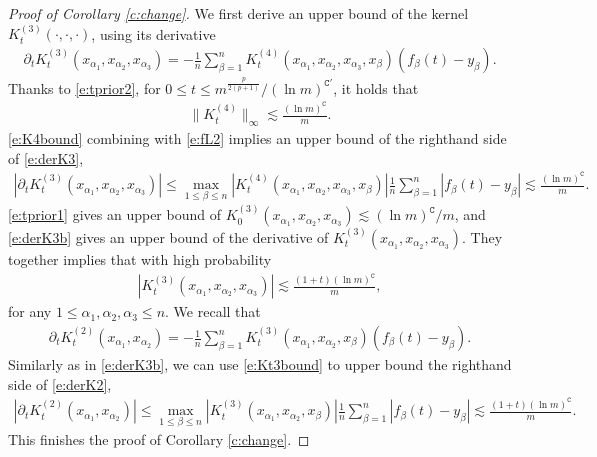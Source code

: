\documentclass{article}
\numberwithin{equation}{section}
\newcommand{\fC}{{\mathtt C}}
\newcommand{\al}{\alpha}
\renewcommand{\leq}{\leqslant}
\newcommand{\del}{\partial}
\newcommand{\1}{\mathds{1}}
\theoremstyle{plain} %
\begin{document}
\begin{proof}[Proof of Corollary \ref{c:change}]
We first derive an upper bound of the kernel $K_t^{(3)}(\cdot, \cdot, \cdot)$, using its derivative
\begin{align}\label{e:derK3}
\del_tK_t^{(3)}(x_{\al_1},x_{\al_2}, x_{\al_3})=-\frac{1}{n} \sum_{\beta=1}^n K^{(4)}_t(x_{\al_1}, x_{\al_2}, x_{\alpha_3}, x_\beta)(f_\beta(t)-y_\beta).
\end{align}
Thanks to \eqref{e:tprior2}, for $0\leq t\leq m^{\frac{p}{2(p+1)}}/(\ln m)^{\fC'}$, it holds that
\begin{align}\label{e:K4bound}
\|K^{(4)}_t\|_{\infty}\lesssim \frac{(\ln m)^\fC}{m}.
\end{align}
\eqref{e:K4bound} combining with \eqref{e:fL2} implies an upper bound of the righthand side of \eqref{e:derK3},
\begin{align}\label{e:derK3b}
\left|\del_tK_t^{(3)}(x_{\al_1},x_{\al_2}, x_{\al_3})\right|\leq \max_{1\leq \beta \leq n}|K^{(4)}_t(x_{\al_1}, x_{\al_2}, x_{\alpha_3}, x_\beta)|\frac{1}{n} \sum_{\beta=1}^n |f_\beta(t)-y_\beta|
\lesssim \frac{(\ln m)^{\fC}}{m}.
\end{align}
\eqref{e:tprior1} gives an upper bound of $K_0^{(3)}(x_{\al_1},x_{\al_2}, x_{\al_3})\lesssim (\ln m)^{\fC}/m$, and \eqref{e:derK3b} gives an upper bound of the derivative of $K_t^{(3)}(x_{\al_1},x_{\al_2}, x_{\al_3})$. They together implies that with high probability
\begin{align}\label{e:Kt3bound}
|K_t^{(3)}(x_{\al_1},x_{\al_2}, x_{\al_3})|\lesssim \frac{(1+t)(\ln m)^{\fC}}{m},
\end{align}
for any $1\leq \al_1, \al_2,\al_3\leq n$.
We recall that
\begin{align}\label{e:derK2}
\del_tK_t^{(2)}(x_{\al_1},x_{\al_2})=-\frac{1}{n} \sum_{\beta=1}^n K^{(3)}_t(x_{\al_1}, x_{\al_2}, x_\beta)(f_\beta(t)-y_\beta).
\end{align}
Similarly as in \eqref{e:derK3b}, we can use \eqref{e:Kt3bound} to upper bound the righthand side of \eqref{e:derK2},
\begin{align*}
\left|\del_tK_t^{(2)}(x_{\al_1},x_{\al_2})\right|\leq \max_{1\leq \beta\leq n}|K^{(3)}_t(x_{\al_1}, x_{\al_2}, x_\beta)|\frac{1}{n} \sum_{\beta=1}^n |f_\beta(t)-y_\beta|\lesssim \frac{(1+t)(\ln m)^{\fC}}{m}.
\end{align*}
This finishes the proof of Corollary \eqref{c:change}.
\end{proof}
\end{document}
